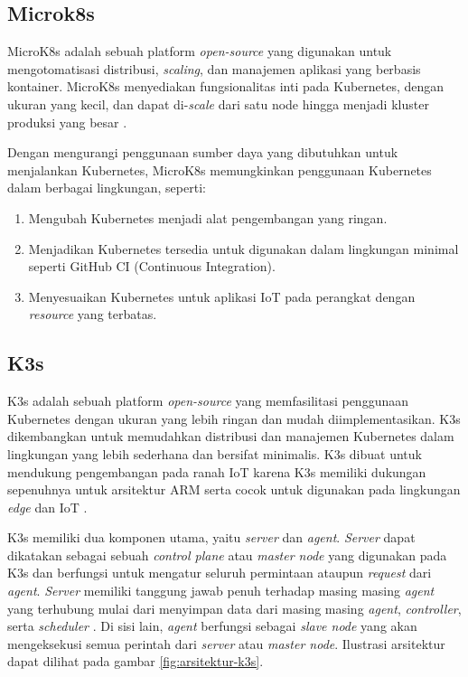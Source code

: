 \subsection{Microk8s}
MicroK8s adalah sebuah platform \textit{open-source} yang digunakan untuk mengotomatisasi distribusi, \textit{scaling}, dan manajemen aplikasi yang berbasis kontainer. MicroK8s menyediakan fungsionalitas inti pada Kubernetes, dengan ukuran yang kecil, dan dapat di-\textit{scale} dari satu node hingga menjadi kluster produksi yang besar \parencite{microk8s}.

Dengan mengurangi penggunaan sumber daya yang dibutuhkan untuk menjalankan Kubernetes, MicroK8s memungkinkan penggunaan Kubernetes dalam berbagai lingkungan, seperti:

\begin{enumerate}
  \item Mengubah Kubernetes menjadi alat pengembangan yang ringan.
  \item Menjadikan Kubernetes tersedia untuk digunakan dalam lingkungan minimal seperti GitHub CI (Continuous Integration).
  \item Menyesuaikan Kubernetes untuk aplikasi IoT pada perangkat dengan \textit{resource} yang terbatas.
\end{enumerate}


\subsection{K3s}
K3s adalah sebuah platform \textit{open-source} yang memfasilitasi penggunaan Kubernetes dengan ukuran yang lebih ringan dan mudah diimplementasikan. K3s dikembangkan untuk memudahkan distribusi dan manajemen Kubernetes dalam lingkungan yang lebih sederhana dan bersifat minimalis. K3s dibuat untuk mendukung pengembangan pada ranah IoT karena K3s memiliki dukungan sepenuhnya untuk arsitektur ARM serta cocok untuk digunakan pada lingkungan \textit{edge} dan IoT \parencite{k3s}.

K3s memiliki dua komponen utama, yaitu \textit{server} dan \textit{agent}. \textit{Server} dapat dikatakan sebagai sebuah \textit{control plane} atau \textit{master node} yang digunakan pada K3s dan berfungsi untuk mengatur seluruh permintaan ataupun \textit{request} dari \textit{agent}. \textit{Server} memiliki tanggung jawab penuh terhadap masing masing \textit{agent} yang terhubung mulai dari menyimpan data dari masing masing \textit{agent}, \textit{controller}, serta \textit{scheduler} \parencite{k3s}. Di sisi lain, \textit{agent} berfungsi sebagai \textit{slave node} yang akan mengeksekusi semua perintah dari \textit{server} atau \textit{master node}. Ilustrasi arsitektur dapat dilihat pada gambar \ref{fig:arsitektur-k3s}.

